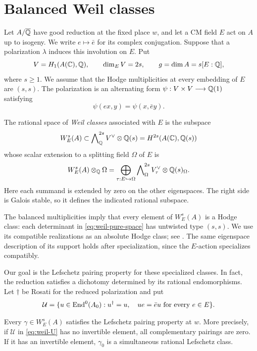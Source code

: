 \section{Balanced Weil classes}\label{sec:weil}

Let $A/\overline{\mathbb Q}$ have good reduction at the fixed place $w$, and let a CM
field $E$ act on $A$ up to isogeny.  We write $e\mapsto\bar e$ for its
complex conjugation.  Suppose that a polarization $\lambda$ induces this
involution on $E$.  Put
\[
 V=H_1(A(\mathbb C),\mathbb Q),\qquad \dim_E V=2s,\qquad
 g=\dim A=s[E:\mathbb Q],
\]
where $s\geq 1$.  We assume that the Hodge multiplicities at every
embedding of $E$ are $(s,s)$.  The polarization is an alternating form
$\psi:V\times V\longrightarrow\mathbb Q(1)$ satisfying
\[
 \psi(ex,y)=\psi(x,\bar e y).
\]

\begin{definition}\label{def:weil-space}
The rational space of \emph{Weil classes} associated with $E$ is the
subspace
\[
 W_E^s(A)\subset
 \bigwedge\nolimits_{\mathbb Q}^{2s} V^\vee\otimes\mathbb Q(s)
       =H^{2s}(A(\mathbb C),\mathbb Q(s))
\]
whose scalar extension to a splitting field $\Omega$ of $E$ is
\begin{equation}\label{eq:weil-pure-space}
 W_E^s(A)\otimes_\mathbb Q\Omega
 =\bigoplus_{\tau:E\hookrightarrow\Omega}
       \bigwedge\nolimits_\Omega^{2s}V_\tau^\vee
          \otimes\mathbb Q(s)_\Omega.
\end{equation}
Here each summand is extended by zero on the other eigenspaces.  The
right side is Galois stable, so it defines the indicated rational
subspace.
\end{definition}

The balanced multiplicities imply that every element of $W_E^s(A)$ is
a Hodge class: each determinant in \eqref{eq:weil-pure-space} has
untwisted type $(s,s)$.  We use its compatible realizations as an
absolute Hodge class; see \cite{Deligne1982}.  The same eigenspace
description of its support holds after specialization, since the
$E$-action specializes compatibly.

Our goal is the Lefschetz pairing property for these specialized
classes.  In fact, the reduction satisfies a dichotomy determined by
its rational endomorphisms.  Let $\dagger$ be Rosati for the reduced
polarization and put
\begin{equation}\label{eq:weil-U}
 \mathcal U=
 \{u\in\operatorname{End}^0(A_0):u^\dagger=u,\quad
                      ue=\bar e u\ \text{for every }e\in E\}.
\end{equation}

\begin{proposition}\label{prop:weil}
Every $\gamma\in W_E^s(A)$ satisfies the Lefschetz pairing property
at $w$.  More precisely, if $\mathcal U$ in \eqref{eq:weil-U} has no
invertible element, all complementary pairings are zero.  If it has
an invertible element, $\gamma_0$ is a simultaneous rational
Lefschetz class.
\end{proposition}

